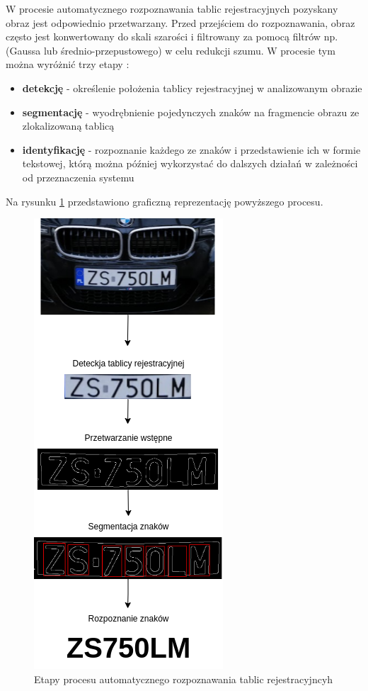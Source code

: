 W procesie automatycznego rozpoznawania tablic rejestracyjnych pozyskany obraz jest odpowiednio przetwarzany.
Przed przejściem do rozpoznawania, obraz często jest konwertowany do skali szarości i filtrowany za pomocą filtrów np.
(Gaussa lub średnio-przepustowego) w celu redukcji szumu.
W procesie tym można wyróżnić trzy etapy \cite{1688109}:
\begin{itemize}
    \item \textbf{detekcję} - określenie położenia tablicy rejestracyjnej w analizowanym obrazie
    \item \textbf{segmentację} - wyodrębnienie pojedynczych znaków na fragmencie obrazu ze zlokalizowaną tablicą
    \item \textbf{identyfikację} - rozpoznanie każdego ze znaków i przedstawienie ich w formie tekstowej, którą można później wykorzystać do dalszych działań w zależności od przeznaczenia systemu
\end{itemize}
\FloatBarrier
\flushleft Na rysunku \ref{fig:schemat_lpr} przedstawiono graficzną reprezentację powyższego procesu.
\begin{figure}[!ht]
    \centering
    \includegraphics[scale=0.6]{Pictures/schemat_lpr.png}
    \caption{Etapy procesu automatycznego rozpoznawania tablic rejestracyjncyh}
    \label{fig:schemat_lpr}
\end{figure}
